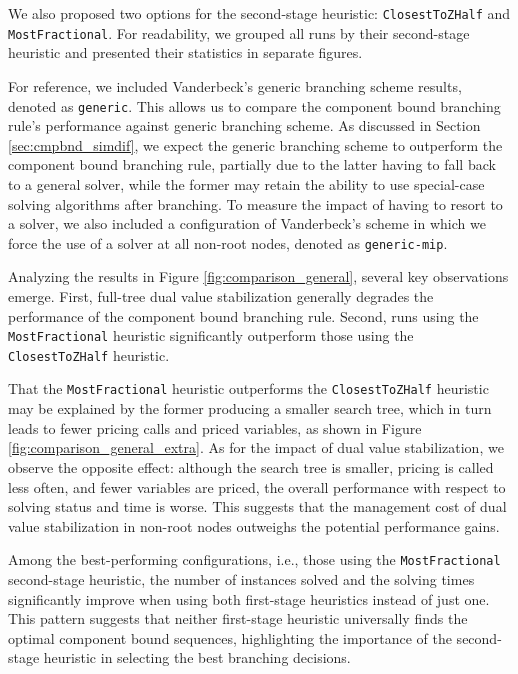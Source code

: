 We also proposed two options for the second-stage heuristic: \texttt{ClosestToZHalf} and \texttt{MostFractional}. For readability, we grouped all runs by their second-stage heuristic and presented their statistics in separate figures.

For reference, we included Vanderbeck's generic branching scheme results, denoted as \texttt{generic}. This allows us to compare the component bound branching rule's performance against generic branching scheme. As discussed in Section \ref{sec:cmpbnd_simdif}, we expect the generic branching scheme to outperform the component bound branching rule, partially due to the latter having to fall back to a general \MIP{} solver, while the former may retain the ability to use special-case solving algorithms after branching. To measure the impact of having to resort to a \MIP{} solver, we also included a configuration of Vanderbeck's scheme in which we force the use of a \MIP{} solver at all non-root nodes, denoted as \texttt{generic-mip}.

Analyzing the results in Figure \ref{fig:comparison_general}, several key observations emerge. First, full-tree dual value stabilization generally degrades the performance of the component bound branching rule. Second, runs using the \texttt{MostFractional} heuristic significantly outperform those using the \texttt{ClosestToZHalf} heuristic.

That the \texttt{MostFractional} heuristic outperforms the \texttt{ClosestToZHalf} heuristic may be explained by the former producing a smaller search tree, which in turn leads to fewer pricing calls and priced variables, as shown in Figure \ref{fig:comparison_general_extra}. As for the impact of dual value stabilization, we observe the opposite effect: although the search tree is smaller, pricing is called less often, and fewer variables are priced, the overall performance with respect to solving status and time is worse. This suggests that the management cost of dual value stabilization in non-root nodes outweighs the potential performance gains.

Among the best-performing configurations, i.e., those using the \texttt{MostFractional} second-stage heuristic, the number of instances solved and the solving times significantly improve when using both first-stage heuristics instead of just one. This pattern suggests that neither first-stage heuristic universally finds the optimal component bound sequences, highlighting the importance of the second-stage heuristic in selecting the best branching decisions.

